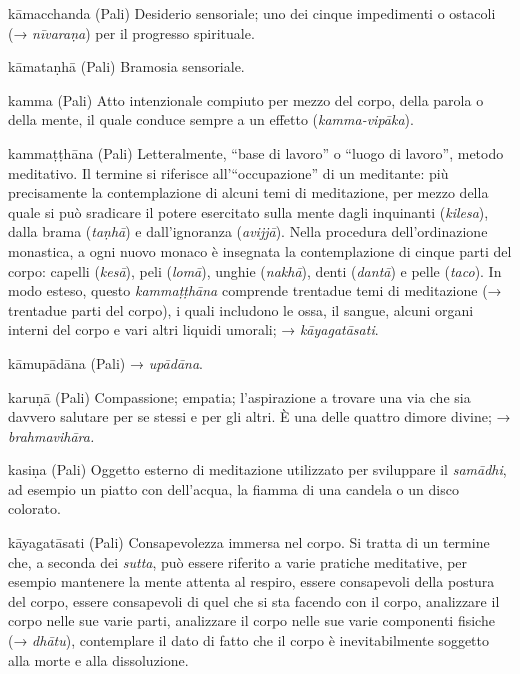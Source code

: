 \begin{glossarydescription}
\item[kāmacchanda] (Pali) Desiderio sensoriale; uno dei cinque impedimenti o
ostacoli (→ \emph{nīvaraṇa}) per il progresso spirituale.

\item[kāmataṇhā] (Pali) Bramosia sensoriale.

\item[kamma] (Pali) Atto intenzionale compiuto per mezzo del corpo, della
parola o della mente, il quale conduce sempre a un effetto
(\emph{kamma-vipāka}).

\item[kammaṭṭhāna] (Pali) Letteralmente, ``base di lavoro'' o ``luogo di
lavoro'', metodo meditativo. Il termine si riferisce all'``occupazione''
di un meditante: più precisamente la contemplazione di alcuni temi di
meditazione, per mezzo della quale si può sradicare il potere esercitato
sulla mente dagli inquinanti (\emph{kilesa}), dalla brama (\emph{taṇhā})
e dall'ignoranza (\emph{avijjā}). Nella procedura dell'ordinazione
monastica, a ogni nuovo monaco è insegnata la contemplazione di cinque
parti del corpo: capelli (\emph{kesā}), peli (\emph{lomā}), unghie
(\emph{nakhā}), denti (\emph{dantā}) e pelle (\emph{taco}). In modo
esteso, questo \emph{kammaṭṭhāna} comprende trentadue temi di
meditazione (→ trentadue parti del corpo), i quali includono le ossa, il
sangue, alcuni organi interni del corpo e vari altri liquidi umorali; →
\emph{kāyagatāsati}.

\item[kāmupādāna] (Pali) → \emph{upādāna}.

\item[karuṇā] (Pali) Compassione; empatia; l'aspirazione a trovare una via che
sia davvero salutare per se stessi e per gli altri. È una delle quattro
dimore divine; → \emph{brahmavihāra.}

\item[kasiṇa] (Pali) Oggetto esterno di meditazione utilizzato per sviluppare
il \emph{samādhi}, ad esempio un piatto con dell'acqua, la fiamma di una
candela o un disco colorato.

\item[kāyagatāsati] (Pali) Consapevolezza immersa nel corpo. Si tratta di un
termine che, a seconda dei \emph{sutta}, può essere riferito a varie
pratiche meditative, per esempio mantenere la mente attenta al respiro,
essere consapevoli della postura del corpo, essere consapevoli di quel
che si sta facendo con il corpo, analizzare il corpo nelle sue varie
parti, analizzare il corpo nelle sue varie componenti fisiche (→
\emph{dhātu}), contemplare il dato di fatto che il corpo è
inevitabilmente soggetto alla morte e alla dissoluzione.


\end{glossarydescription}
